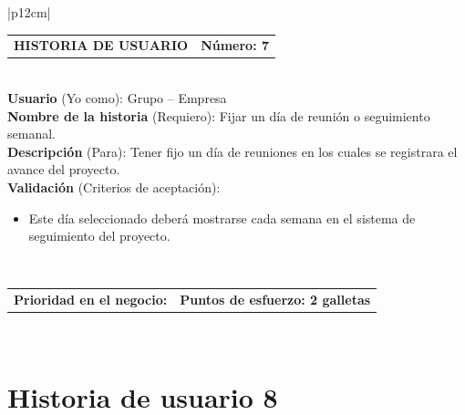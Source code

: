 \documentclass[11pt,letterpaper]{report}
\begin{document}
	\begin{center}	
		\begin{tabular}{|p{12cm}|}
			\hline
			\begin{tabular}{c|c}
				\textbf{HISTORIA DE USUARIO} & \textbf{Número: 7} \\
			\end{tabular} \\ \hline
			\textbf{Usuario} (Yo como): Grupo – Empresa \\ \hline
			\textbf{Nombre de la historia} (Requiero): Fijar un día de reunión o seguimiento semanal. \\ \hline
			\textbf{Descripción} (Para): Tener fijo un día de reuniones en los cuales se registrara el avance del proyecto. \\ \hline
			\textbf{Validación} (Criterios de aceptación): \\
			\begin{minipage}{12cm}
				\begin{itemize}
					\item Este día seleccionado deberá mostrarse cada semana en el sistema de seguimiento del proyecto.
				\end{itemize}
			\end{minipage} \\ \hline
			\begin{tabular}{p{6cm}|c}
				\textbf{Prioridad en el negocio: } & \textbf{Puntos de esfuerzo: 2 galletas} \\
			\end{tabular} \\ \hline
		\end{tabular}
	\end{center}
	
	\section{Historia de usuario 8}
	
\end{document}
